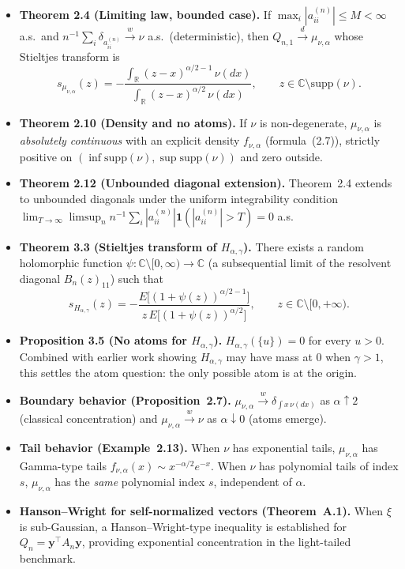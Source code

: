 \documentclass[11pt,a4paper]{article}
\theoremstyle{definition}
\begin{document}
\begin{itemize}[leftmargin=*]

\item \textbf{Theorem 2.4 (Limiting law, bounded case).}
If $\max_i|a_{ii}^{(n)}|\le M<\infty$ a.s.\ and $n^{-1}\sum_i\delta_{a_{ii}^{(n)}}\xrightarrow{w}\nu$ a.s.\ (deterministic), then $Q_{n,1}\xrightarrow{d}\mu_{\nu,\alpha}$ whose Stieltjes transform is
\[
  \boxed{\;s_{\mu_{\nu,\alpha}}(z) = -\frac{\displaystyle\int_{\mathbb{R}}(z-x)^{\alpha/2-1}\,\nu(dx)}{\displaystyle\int_{\mathbb{R}}(z-x)^{\alpha/2}\,\nu(dx)},\qquad z\in\mathbb{C}\setminus\mathrm{supp}(\nu).\;}
\]

\item \textbf{Theorem 2.10 (Density and no atoms).}
If $\nu$ is non-degenerate, $\mu_{\nu,\alpha}$ is \emph{absolutely continuous} with an explicit density $f_{\nu,\alpha}$ (formula~(2.7)), strictly positive on $(\inf\mathrm{supp}(\nu),\sup\mathrm{supp}(\nu))$ and zero outside.

\item \textbf{Theorem 2.12 (Unbounded diagonal extension).}
Theorem~2.4 extends to unbounded diagonals under the uniform integrability condition
$\lim_{T\to\infty}\limsup_n n^{-1}\sum_i |a_{ii}^{(n)}|\mathbf{1}(|a_{ii}^{(n)}|>T)=0$ a.s.

\item \textbf{Theorem 3.3 (Stieltjes transform of $H_{\alpha,\gamma}$).}
There exists a random holomorphic function $\psi:\mathbb{C}\setminus[0,\infty)\to\mathbb{C}$ (a subsequential limit of the resolvent diagonal $B_n(z)_{11}$) such that
\[
  \boxed{\;s_{H_{\alpha,\gamma}}(z)
    = -\frac{E\!\big[(1+\psi(z))^{\alpha/2-1}\big]}{z\,E\!\big[(1+\psi(z))^{\alpha/2}\big]},\qquad z\in\mathbb{C}\setminus[0,+\infty).\;}
\]

\item \textbf{Proposition 3.5 (No atoms for $H_{\alpha,\gamma}$).}
$H_{\alpha,\gamma}(\{u\})=0$ for every $u>0$.  Combined with earlier work showing $H_{\alpha,\gamma}$ may have mass at $0$ when $\gamma>1$, this settles the atom question: the only possible atom is at the origin.

\item \textbf{Boundary behavior (Proposition~2.7).}
$\mu_{\nu,\alpha}\xrightarrow{w}\delta_{\int x\,\nu(dx)}$ as $\alpha\uparrow 2$ (classical concentration) and $\mu_{\nu,\alpha}\xrightarrow{w}\nu$ as $\alpha\downarrow 0$ (atoms emerge).

\item \textbf{Tail behavior (Example~2.13).}
When $\nu$ has exponential tails, $\mu_{\nu,\alpha}$ has Gamma-type tails $f_{\nu,\alpha}(x)\sim x^{-\alpha/2}e^{-x}$.
When $\nu$ has polynomial tails of index $s$, $\mu_{\nu,\alpha}$ has the \emph{same} polynomial index $s$, independent of $\alpha$.

\item \textbf{Hanson--Wright for self-normalized vectors (Theorem~A.1).}
When $\xi$ is sub-Gaussian, a Hanson--Wright-type inequality is established for $Q_n=\mathbf{y}^\top A_n\mathbf{y}$, providing exponential concentration in the light-tailed benchmark.

\end{itemize}
\end{document}
